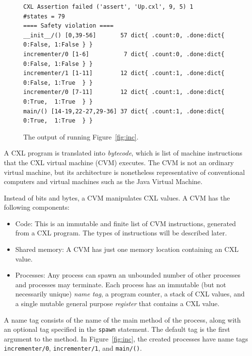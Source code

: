 \documentclass{report}
\newenvironment{code}{
\tcolorbox
}{
\endtcolorbox
}
\begin{document}
\begin{figure}
\begin{code}
\begin{verbatim}
CXL Assertion failed ('assert', 'Up.cxl', 9, 5) 1
#states = 79
==== Safety violation ====
__init__/() [0,39-56]       57 dict{ .count:0, .done:dict{ 0:False, 1:False } }
incrementer/0 [1-6]          7 dict{ .count:0, .done:dict{ 0:False, 1:False } }
incrementer/1 [1-11]        12 dict{ .count:1, .done:dict{ 0:False, 1:True  } }
incrementer/0 [7-11]        12 dict{ .count:1, .done:dict{ 0:True,  1:True  } }
main/() [14-19,22-27,29-36] 37 dict{ .count:1, .done:dict{ 0:True,  1:True  } }
\end{verbatim}
\end{code}
\caption{The output of running Figure~\ref{fig:inc}.}
\label{fig:incoutput}
\end{figure}

A CXL program is translated
into \emph{bytecode}, which is list of machine instructions that the
CXL virtual machine (CVM) executes.
The CVM is not an ordinary virtual machine, but its architecture
is nonetheless representative of conventional computers and
virtual machines such as the Java Virtual Machine.

Instead of bits and bytes, a CVM manipulates CXL values.
A CVM has the following components:
\begin{itemize}
\item Code:  This is an immutable and finite list of CVM instructions,
generated from a CXL program.  The types of instructions will be described later.
\item Shared memory: A CVM has just one memory location containing
an CXL value.
\item Processes:  Any process
can spawn an unbounded number of other processes and processes may terminate.
Each process has an immutable (but not necessarily unique) \emph{name tag},
a program counter,
a stack of CXL values,
and a single mutable general purpose \emph{register}
that contains a CXL value.
\end{itemize}

A name tag consists of the name of the main method of the process,
along with an optional tag specified in the \texttt{spawn}
statement.
The default tag is the first argument to the method.
In Figure~\ref{fig:inc}, the created processes have name tags
\texttt{incrementer/0}, \texttt{incrementer/1}, and \texttt{main/()}.
\end{document}

